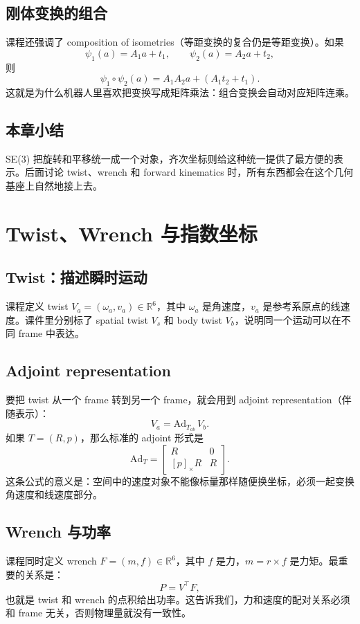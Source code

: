 \documentclass[a4paper]{article}
\begin{document}
\subsection{刚体变换的组合}
课程还强调了 composition of isometries（等距变换的复合仍是等距变换）。如果
\[
\psi_1(a)=A_1 a+t_1,\qquad \psi_2(a)=A_2 a+t_2,
\]
则
\[
\psi_1\circ \psi_2(a)=A_1A_2a+(A_1t_2+t_1).
\]
这就是为什么机器人里喜欢把变换写成矩阵乘法：组合变换会自动对应矩阵连乘。

\subsection{本章小结}
SE(3) 把旋转和平移统一成一个对象，齐次坐标则给这种统一提供了最方便的表示。后面讨论 twist、wrench 和 forward kinematics 时，所有东西都会在这个几何基座上自然地接上去。

\section{Twist、Wrench 与指数坐标}
\subsection{Twist：描述瞬时运动}
课程定义 twist \(V_a=(\omega_a,v_a)\in\mathbb{R}^6\)，其中 \(\omega_a\) 是角速度，\(v_a\) 是参考系原点的线速度。课件里分别标了 spatial twist \(V_s\) 和 body twist \(V_b\)，说明同一个运动可以在不同 frame 中表达。

\subsection{Adjoint representation}
要把 twist 从一个 frame 转到另一个 frame，就会用到 adjoint representation（伴随表示）：
\[
V_a = \mathrm{Ad}_{T_{ab}}\,V_b.
\]
如果 \(T=(R,p)\)，那么标准的 adjoint 形式是
\[
\mathrm{Ad}_T=
\begin{bmatrix}
R & 0\\
[p]_\times R & R
\end{bmatrix}.
\]
这条公式的意义是：空间中的速度对象不能像标量那样随便换坐标，必须一起变换角速度和线速度部分。

\subsection{Wrench 与功率}
课程同时定义 wrench \(F=(m,f)\in\mathbb{R}^6\)，其中 \(f\) 是力，\(m=r\times f\) 是力矩。最重要的关系是：
\[
P = V^\top F,
\]
也就是 twist 和 wrench 的点积给出功率。这告诉我们，力和速度的配对关系必须和 frame 无关，否则物理量就没有一致性。
\end{document}
